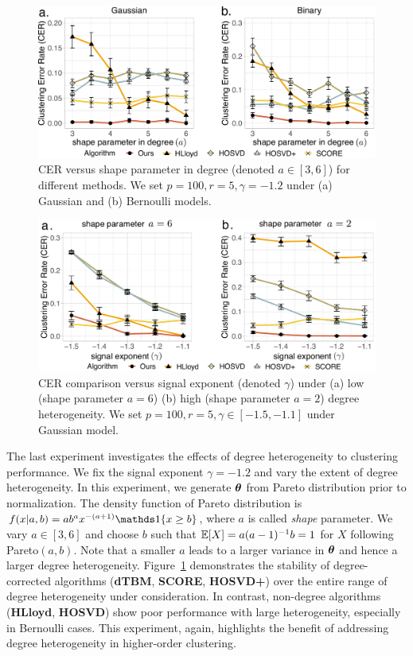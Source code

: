 \documentclass[lettersize,onecolumn,journal]{IEEEtran}
\theoremstyle{definition}
\theoremstyle{definition}
\begin{document}
\begin{figure}[h!]
    \centering
    \includegraphics[width=.8\columnwidth]{comp_theta_anno3.pdf}
    \caption{CER versus shape parameter in degree (denoted $a\in[3,6]$) for different methods. We set $p = 100, r = 5, \gamma = -1.2$ under (a) Gaussian and (b) Bernoulli models.}
    \label{fig:comp_theta}
\end{figure}



\begin{figure}[htp!]
    \centering
    \includegraphics[width=.8\columnwidth]{comp_gamma_theta3.pdf}
    \caption{CER comparison versus signal exponent (denoted $\gamma$) under (a) low (shape parameter $a = 6$)  (b) high (shape parameter $a = 2$) degree heterogeneity. We set $p = 100, r = 5, \gamma \in [-1.5, -1.1]$ under Gaussian model.}
    \label{fig:comp_gamma_theta}
\end{figure}

The last experiment investigates the effects of degree heterogeneity to clustering performance. We fix the signal exponent $\gamma = -1.2$ and vary the extent of degree heterogeneity. In this experiment, we generate $\boldsymbol{\theta}$ from Pareto distribution prior to normalization. The density function of Pareto distribution is $f(x|a,b) = a b^a x^{-(a+1)} \ind\{ x \geq b \}$, where $a$ is called \emph{shape} parameter. We vary $a \in [3,6]$ and choose $b$ such that $\mathbb{E}[X] = a(a - 1)^{-1}b = 1$ for $X$ following Pareto$(a,b)$. Note that a smaller $a$ leads to a larger variance in $\boldsymbol{\theta}$ and hence a larger degree heterogeneity. Figure~\ref{fig:comp_theta} demonstrates the stability of degree-corrected algorithms (\textbf{\small dTBM}, \textbf{\small SCORE}, \textbf{\small HOSVD+}) over the entire range of degree heterogeneity under consideration. In contrast, non-degree algorithms (\textbf{\small HLloyd}, \textbf{\small HOSVD}) show poor performance with large heterogeneity, especially in Bernoulli cases. This experiment, again, highlights the benefit of addressing degree heterogeneity in higher-order clustering. 
\end{document}
